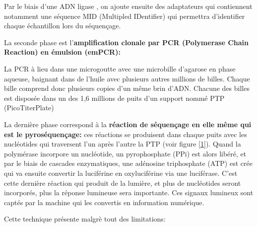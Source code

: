 \documentclass[a4paper]{article}
\begin{document}
Par le biais d'une ADN ligase \cite{sengenes2012developpement}, on ajoute ensuite des adaptateurs qui contiennent notamment une séquence MID (Multipled IDentifier) qui permettra d'identifier chaque échantillon lors du séquençage. \cite{Margulies:2005aa}

La seconde phase est l'\textbf{amplification clonale par PCR (Polymerase Chain Reaction) en émulsion (emPCR):}

La PCR à lieu dans une microgoutte avec une microbille d'agarose en phase aqueuse, baignant dans de l'huile avec plusieurs autres millions de billes. Chaque bille comprend donc plusieurs copies d'un même brin d'ADN. Chacune des billes est disposée dans un des 1,6 millions de puits d'un support nommé PTP (PicoTiterPlate) \cite{sengenes2012developpement}

La dernière phase correspond à la \textbf{réaction de séquençage en elle même qui est le pyroséquençage:} ces réactions se produisent dans chaque puits avec les nucléotides qui traversent l'un après l'autre la PTP (voir figure \ref{1}). Quand la polymérase incorpore un nucléotide, un pyrophosphate (PPi) est alors libéré, et par le biais de cascades enzymatiques, une adénosine triphosphate (ATP) est crée qui va ensuite convertir la luciférine en oxyluciférine via une luciférase. C'est cette dernière réaction qui produit de la lumière, et plus de nucléotides seront incorporés, plus la réponse lumineuse sera importante. Ces signaux lumineux sont captés par la machine qui les convertis en information numérique. \cite{sengenes2012developpement}

Cette technique présente malgrè tout des limitations:
\end{document}
